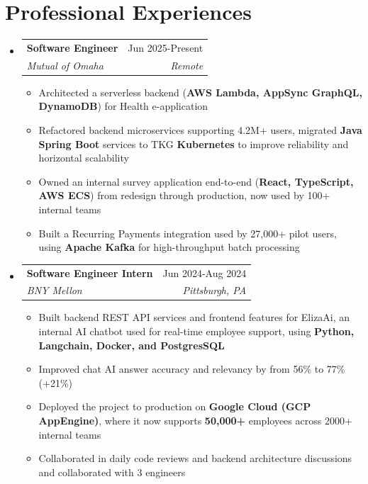 \documentclass[letterpaper,11pt]{article}
\makeatletter
\newcommand{\resumeItem}[1]{
  \item\small{
    {#1 \vspace{-3pt}}
  }
}
\newcommand{\resumeSubheading}[4]{
  \vspace{-2pt}\item
    \begin{tabular*}{0.97\textwidth}[t]{l@{\extracolsep{\fill}}r}
      \textbf{#1} & #2 \\
      \textit{\small#3} & \textit{\small #4} \\
    \end{tabular*}\vspace{-7pt}
}
\newcommand{\resumeSubHeadingListStart}{\begin{itemize}[leftmargin=0.15in, label={}]}
\newcommand{\resumeSubHeadingListEnd}{\end{itemize}}
\newcommand{\resumeItemListStart}{\begin{itemize}}
\newcommand{\resumeItemListEnd}{\end{itemize}\vspace{-5pt}}
\makeatother
\begin{document}
\section{Professional Experiences}
  \resumeSubHeadingListStart
  
    \resumeSubheading
      {Software Engineer}{Jun 2025-Present}
      {Mutual of Omaha}{Remote}
      \resumeItemListStart
        \resumeItem{Architected a serverless backend (\textbf{AWS Lambda, AppSync GraphQL, DynamoDB}) for Health e-application}
        \resumeItem{Refactored backend microservices supporting 4.2M+ users, migrated \textbf{Java Spring Boot} services to TKG \textbf{Kubernetes} to improve reliability and horizontal scalability}
        \resumeItem{Owned an internal survey application end-to-end (\textbf{React, TypeScript, AWS ECS}) from redesign through production, now used by 100+ internal teams}
        \resumeItem{Built a Recurring Payments integration used by 27,000+ pilot users, using \textbf{Apache Kafka} for high-throughput batch processing}
      \resumeItemListEnd

    \resumeSubheading
      {Software Engineer Intern}{Jun 2024-Aug 2024}
      {BNY Mellon}{Pittsburgh, PA}
      \resumeItemListStart
        \resumeItem{Built backend REST API services and frontend features for ElizaAi, an internal AI chatbot used for real-time employee support, using \textbf{Python, Langchain, Docker, and PostgresSQL}}
        \resumeItem{Improved chat AI answer accuracy and relevancy by from 56\% to 77\% (+21\%)}
        \resumeItem{Deployed the project to production on \textbf{Google Cloud (GCP AppEngine)}, where it now supports \textbf{50,000+} employees across 2000+ internal teams}
        \resumeItem{Collaborated in daily code reviews and backend architecture discussions and collaborated with 3 engineers}
    \resumeItemListEnd

  \resumeSubHeadingListEnd



\end{document}
